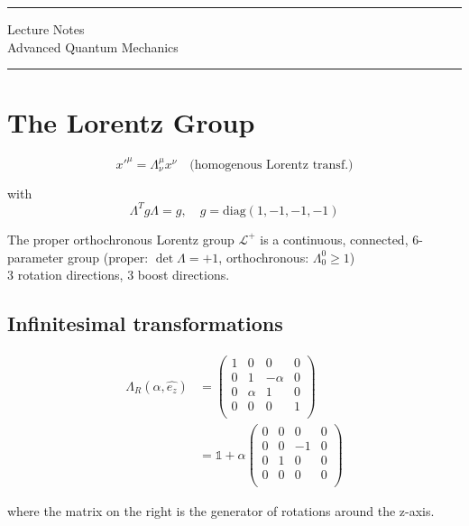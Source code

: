 \documentclass[11pt]{article}
\author{Aayush Arya}
\title{}
\date{January 16, 2023}
\newcommand{\lag}{\mathcal{L}}
\begin{document}
	\maketitle
	
	\hrule
	\begin{center}
		Lecture Notes\\
		Advanced Quantum Mechanics
	\end{center}
	\hrule
	
	\section*{The Lorentz Group}
	
	\[ x'^{\mu} = \Lambda^\mu_\nu x^\nu \quad \text{(homogenous Lorentz transf.)}\]

with \[ \Lambda^T g \Lambda = g, \quad g = \text{diag}(1, -1, -1, -1)	\]
	
	The proper orthochronous Lorentz group $\lag^+$ is a continuous, connected, 6-parameter group  (proper: $\det \Lambda = + 1$, orthochronous: $\Lambda^0_0 \geq 1 $)\\
	
	3 rotation directions, 3 boost directions.
	
	\subsection*{Infinitesimal transformations}

	\begin{align*}
		\Lambda_R(\alpha, \hat{e_z}) & = \begin{pmatrix}
			1 & 0 & 0 & 0\\
			0 & 1 & -\alpha & 0\\
			0 & \alpha & 1 & 0\\
			0 & 0 & 0 & 1\\
		\end{pmatrix}\\	
	& = \mathbb{1} + \alpha \begin{pmatrix}
		0 & 0 &0& 0\\
		0 & 0 & -1 & 0\\
		0 & 1 & 0 & 0 \\
		0 & 0& 0& 0\\
	\end{pmatrix}
	\end{align*}
	 

where the matrix on the right is the generator of rotations around the z-axis.
\end{document}
